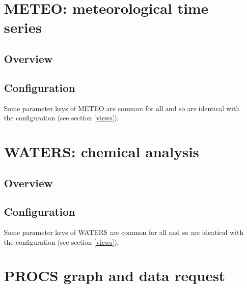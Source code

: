 \section{METEO: meteorological time series}

\subsection{Overview}

\subsection{Configuration}

Some parameter keys of METEO are common for all  and  so are identical with the  configuration (see section \ref{views}).




\section{WATERS: chemical analysis}

\subsection{Overview}

\subsection{Configuration}

Some parameter keys of WATERS are common for all  and  so are identical with the  configuration (see section \ref{views}).




\newpage
\section{PROCS graph and data request}
\label{procrequest}
